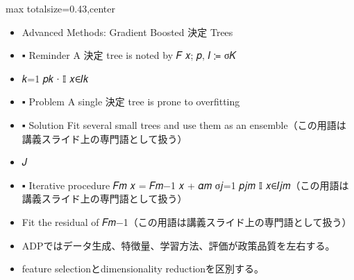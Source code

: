 \clearpage
{}
\begin{minipage}[t]{0.405\textwidth}
\begin{adjustbox}{max totalsize={\textwidth}{0.43\textheight},center}
\begin{minipage}{\textwidth}\scriptsize
{}\begin{itemize}
\item Advanced Methods: Gradient Boosted 決定 Trees
\item ▪ Reminder A 決定 tree is noted by 𝐹 𝑥; 𝑝, 𝐼 ≔ σ𝐾
\item 𝑘=1 𝑝𝑘 ∙ 𝕀 𝑥∈𝐼𝑘
\item ▪ Problem A single 決定 tree is prone to overfitting
\item ▪ Solution Fit several small trees and use them as an ensemble（この用語は講義スライド上の専門語として扱う）
\item 𝐽
\item ▪ Iterative procedure 𝐹𝑚 𝑥 = 𝐹𝑚−1 𝑥 + 𝛼𝑚 σ𝑗=1 𝑝𝑗𝑚 𝕀 𝑥∈𝐼𝑗𝑚（この用語は講義スライド上の専門語として扱う）
\item Fit the residual of 𝐹𝑚−1（この用語は講義スライド上の専門語として扱う）
\end{itemize}\begin{itemize}
\item ADPではデータ生成、特徴量、学習方法、評価が政策品質を左右する。
\item feature selectionとdimensionality reductionを区別する。
\end{itemize}
\end{minipage}
\end{adjustbox}
\end{minipage}\hfill
